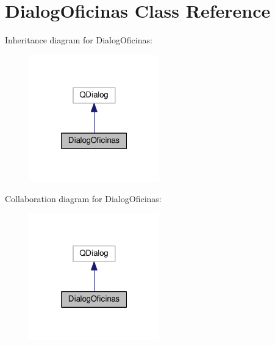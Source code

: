 \hypertarget{classDialogOficinas}{}\section{Dialog\+Oficinas Class Reference}
\label{classDialogOficinas}


Inheritance diagram for Dialog\+Oficinas\+:
\nopagebreak
\begin{figure}[H]
\begin{center}
\leavevmode
\includegraphics[width=160pt]{classDialogOficinas__inherit__graph}
\end{center}
\end{figure}


Collaboration diagram for Dialog\+Oficinas\+:
\nopagebreak
\begin{figure}[H]
\begin{center}
\leavevmode
\includegraphics[width=160pt]{classDialogOficinas__coll__graph}
\end{center}
\end{figure}
